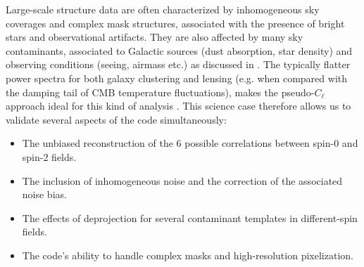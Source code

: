 \documentclass[usenatbib]{mnrasb}
\begin{document}
        Large-scale structure data are often characterized by inhomogeneous sky coverages and complex mask structures, associated with the presence of bright stars and observational artifacts. They are also affected by many sky contaminants, associated to Galactic sources (dust absorption, star density) and observing conditions (seeing, airmass etc.) as discussed in \citet{2016ApJS..226...24L}. The typically flatter power spectra for both galaxy clustering and lensing (e.g. when compared with the damping tail of CMB temperature fluctuations), makes the pseudo-$C_\ell$ approach ideal for this kind of analysis \citep{2013MNRAS.435.1857L,2016ApJS..226...24L}. This science case therefore allows us to validate several aspects of the code simultaneously:
        \begin{itemize}
          \item The unbiased reconstruction of the 6 possible correlations between spin-0 and spin-2 fields.
          \item The inclusion of inhomogeneous noise and the correction of the associated noise bias.
          \item The effects of deprojection for several contaminant templates in different-spin fields.
          \item The code's ability to handle complex masks and high-resolution pixelization.
        \end{itemize}
\end{document}
